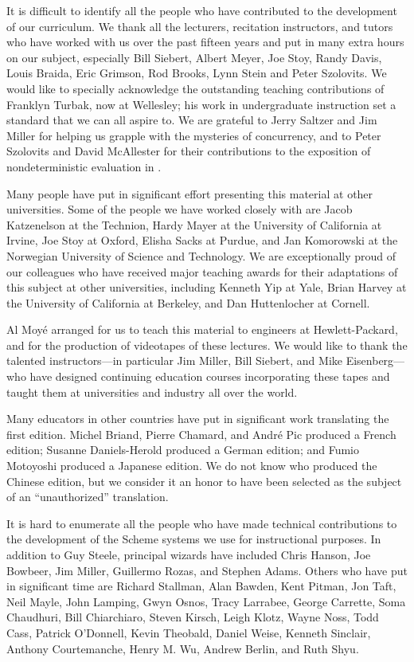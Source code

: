 It is difficult to identify all the people who have contributed to the development of our curriculum.
We thank all the lecturers, recitation instructors, and tutors who have worked with us over the past fifteen years and put in many extra hours on our subject, especially Bill Siebert, Albert Meyer, Joe Stoy, Randy Davis, Louis Braida, Eric Grimson, Rod Brooks, Lynn Stein and Peter Szolovits.
We would like to specially acknowledge the outstanding teaching contributions of Franklyn Turbak, now at Wellesley;
his work in undergraduate instruction set a standard that we can all aspire to.
We are grateful to Jerry Saltzer and Jim Miller for helping us grapple with the mysteries of concurrency, and to Peter Szolovits and David McAllester for their contributions to the exposition of nondeterministic evaluation in .

Many people have put in significant effort presenting this material at other universities.
Some of the people we have worked closely with are Jacob Katzenelson at the Technion, Hardy Mayer at the University of California at Irvine, Joe Stoy at Oxford, Elisha Sacks at Purdue, and Jan Komorowski at the Norwegian University of Science and Technology.
We are exceptionally proud of our colleagues who have received major teaching awards for their adaptations of this subject at other universities, including Kenneth Yip at Yale, Brian Harvey at the University of California at Berkeley, and Dan Huttenlocher at Cornell.

Al Moyé arranged for us to teach this material to engineers at Hewlett-Packard, and for the production of videotapes of these lectures.
We would like to thank the talented instructors---in particular Jim Miller, Bill Siebert, and Mike Eisenberg---who have designed continuing education courses incorporating these tapes and taught them at universities and industry all over the world.

Many educators in other countries have put in significant work translating the
first edition.
Michel Briand, Pierre Chamard, and André Pic produced a French edition;
Susanne Daniels-Herold produced a German edition;
and Fumio Motoyoshi produced a Japanese edition.
We do not know who produced the Chinese edition, but we consider it an honor to have been selected as the subject of an “unauthorized” translation.

It is hard to enumerate all the people who have made technical contributions to the development of the Scheme systems we use for instructional purposes.
In addition to Guy Steele, principal wizards have included Chris Hanson, Joe Bowbeer, Jim Miller, Guillermo Rozas, and Stephen Adams.
Others who have put in significant time are Richard Stallman, Alan Bawden, Kent Pitman, Jon Taft, Neil Mayle, John Lamping, Gwyn Osnos, Tracy Larrabee, George Carrette, Soma Chaudhuri, Bill Chiarchiaro, Steven Kirsch, Leigh Klotz, Wayne Noss, Todd Cass, Patrick O'Donnell, Kevin Theobald, Daniel Weise, Kenneth Sinclair, Anthony Courtemanche, Henry M. Wu, Andrew Berlin, and Ruth Shyu.

